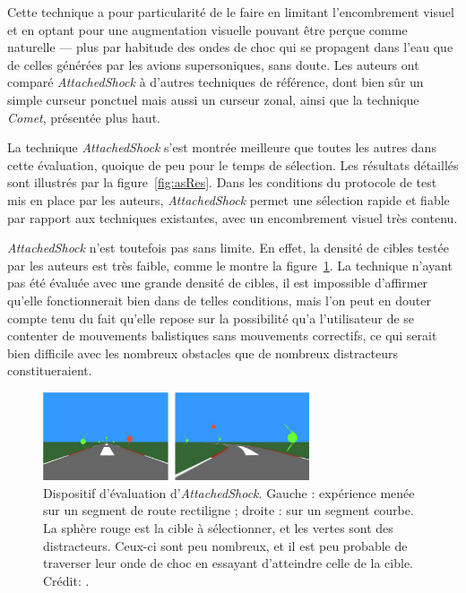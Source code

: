 	Cette technique a pour particularité de le faire en limitant l'encombrement visuel et en optant pour une augmentation visuelle pouvant être perçue comme \og naturelle \fg{} --- plus par habitude des ondes de choc qui se propagent dans l'eau que de celles générées par les avions supersoniques, sans doute. Les auteurs ont comparé \emph{AttachedShock} à d'autres techniques de référence, dont bien sûr un simple curseur ponctuel mais aussi un curseur zonal, ainsi que la technique \emph{Comet}, présentée plus haut.

	La technique \emph{AttachedShock} s'est montrée meilleure que toutes les autres dans cette évaluation, quoique de peu pour le temps de sélection. Les résultats détaillés sont illustrés par la figure~\ref{fig:asRes}. Dans les conditions du protocole de test mis en place par les auteurs, \emph{AttachedShock} permet une sélection rapide et fiable par rapport aux techniques existantes, avec un encombrement visuel très contenu.
	
	\emph{AttachedShock} n'est toutefois pas sans limite. En effet, la densité de cibles testée par les auteurs est très faible, comme le montre la figure~\ref{fig:asDensity}. La technique n'ayant pas été évaluée avec une grande densité de cibles, il est impossible d'affirmer qu'elle fonctionnerait bien dans de telles conditions, mais l'on peut en douter compte tenu du fait qu'elle repose sur la possibilité qu'a l'utilisateur de se \og contenter \fg{} de mouvements balistiques sans mouvements correctifs, ce qui serait bien difficile avec les nombreux obstacles que de nombreux distracteurs constitueraient.
	
	\begin{figure}[!htbp]
		\centering
		\includegraphics[width=0.7\textwidth]{figures/ch2/asDensity}
		\caption[\emph{AttachedShock}, densité de cibles]{Dispositif d'évaluation d'\emph{AttachedShock}. Gauche : expérience menée sur un segment de route rectiligne ; droite : sur un segment courbe. La sphère rouge est la cible à sélectionner, et les vertes sont des distracteurs. Ceux-ci sont peu nombreux, et il est peu probable de \og traverser \fg{} leur onde de choc en essayant d'atteindre celle de la cible. Crédit: \cite{you2012attachedshock}.}
		\label{fig:asDensity}
	\end{figure}
	
